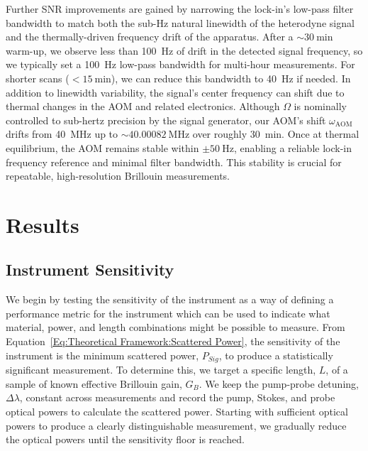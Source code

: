 Further \ac{SNR} improvements are gained by narrowing the lock-in’s low-pass filter bandwidth to match both the sub-\si{\hertz} natural linewidth of the heterodyne signal and the thermally-driven frequency drift of the apparatus. After a \(\sim\!\SI{30}{\minute}\) warm-up, we observe less than \SI{100}{\hertz} of drift in the detected signal frequency, so we typically set a \SI{100}{\hertz} low-pass bandwidth for multi-hour measurements. For shorter scans (\(< \SI{15}{\minute}\)), we can reduce this bandwidth to \SI{40}{\hertz} if needed. In addition to linewidth variability, the signal’s center frequency can shift due to thermal changes in the \ac{AOM} and related electronics. Although \(\Omega\) is nominally controlled to sub-hertz precision by the signal generator, our \ac{AOM}’s shift \(\omega_{\mathrm{AOM}}\) drifts from \SI{40}{\mega\hertz} up to \(\sim\!\SI{40.00082}{\mega\hertz}\) over roughly \SI{30}{\minute}. Once at thermal equilibrium, the \ac{AOM} remains stable within \(\pm\SI{50}{\hertz}\), enabling a reliable lock-in frequency reference and minimal filter bandwidth. This stability is crucial for repeatable, high-resolution Brillouin measurements.

\section{Results}\label{Results}
\subsection{Instrument Sensitivity}
\label{Results:Instrument sensitivity}

We begin by testing the sensitivity of the instrument as a way of defining a performance metric for the instrument which can be used to indicate what material, power, and length combinations might be possible to measure. From Equation~\ref{Eq:Theoretical Framework:Scattered Power}, the sensitivity of the instrument is the minimum scattered power, \(P_{Sig}\), to produce a statistically significant measurement. To determine this, we target a specific length, \(L\), of a sample of known effective Brillouin gain, \(G_B\). We keep the pump-probe detuning, \(\Delta\lambda\), constant across measurements and record the pump, Stokes, and probe optical powers to calculate the scattered power. Starting with sufficient optical powers to produce a clearly distinguishable measurement, we gradually reduce the optical powers until the sensitivity floor is reached.

